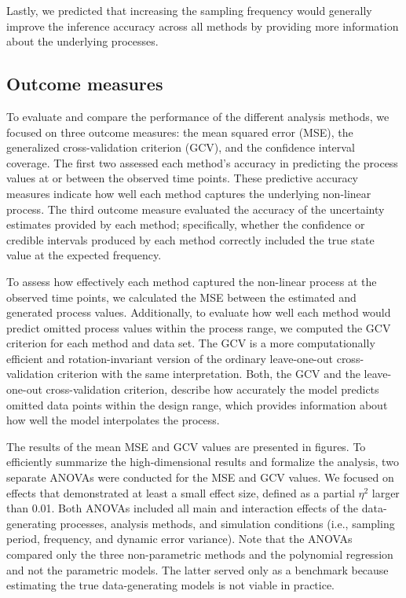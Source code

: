 \documentclass[man, floatsintext]{apa7}
\begin{document}
Lastly, we predicted that increasing the sampling frequency would generally
improve the inference accuracy across all methods by providing more information
about the underlying processes.

\subsection{Outcome measures}

To evaluate and compare the performance of the different analysis methods, we
focused on three outcome measures: the mean squared error (MSE), the
generalized cross-validation criterion (GCV), and the confidence interval
coverage. The first two assessed each method's accuracy in predicting the
process values at or between the observed time points. These predictive
accuracy measures indicate how well each method captures the underlying
non-linear process. The third outcome measure evaluated the accuracy of the
uncertainty estimates provided by each method; specifically, whether the
confidence or credible intervals produced by each method correctly included the
true state value at the expected frequency.

To assess how effectively each method captured the non-linear process at the
observed time points, we calculated the MSE between the estimated and generated
process values. Additionally, to evaluate how well each method would predict
omitted process values within the process range, we computed the GCV
\parencite{golub_generalized_1979} criterion for each method and data set. The
GCV is a more computationally efficient and rotation-invariant version of the
ordinary leave-one-out cross-validation criterion with the same interpretation.
Both, the GCV and the leave-one-out cross-validation criterion, describe how
accurately the model predicts omitted data points within the design range,
which provides information about how well the model interpolates the process.

The results of the mean MSE and GCV values are presented in
figures. To efficiently summarize the high-dimensional results and formalize
the analysis, two separate ANOVAs were conducted for the MSE and GCV values. We
focused on effects that demonstrated at least a small effect size, defined as a
partial $\eta^2$ larger than 0.01. Both ANOVAs included all main and
interaction
effects of the data-generating processes, analysis methods, and simulation
conditions (i.e., sampling period, frequency, and dynamic error variance). Note
that the ANOVAs compared only the three non-parametric methods and the
polynomial regression and not the parametric models. The latter served only as
a benchmark because estimating the true data-generating models is not viable in
practice.
\end{document}

